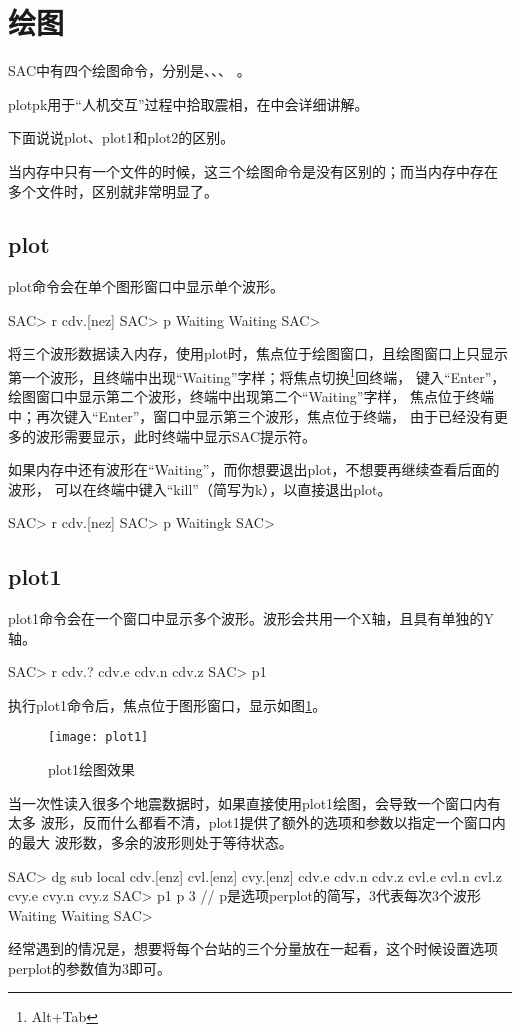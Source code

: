 \section{绘图}
SAC中有四个绘图命令，分别是、、、
。

plotpk用于``人机交互''过程中拾取震相，在中会详细讲解。

下面说说plot、plot1和plot2的区别。

当内存中只有一个文件的时候，这三个绘图命令是没有区别的；而当内存中存在
多个文件时，区别就非常明显了。

\subsection{plot}
plot命令会在单个图形窗口中显示单个波形。
\begin{SACCode}
SAC> r cdv.[nez]
SAC> p
Waiting
Waiting
SAC>
\end{SACCode}
将三个波形数据读入内存，使用plot时，焦点位于绘图窗口，且绘图窗口上只显示
第一个波形，且终端中出现``Waiting''字样；将焦点切换\footnote{Alt+Tab}回终端，
键入``Enter''，绘图窗口中显示第二个波形，终端中出现第二个``Waiting''字样，
焦点位于终端中；再次键入``Enter''，窗口中显示第三个波形，焦点位于终端，
由于已经没有更多的波形需要显示，此时终端中显示SAC提示符。

如果内存中还有波形在``Waiting''，而你想要退出plot，不想要再继续查看后面的波形，
可以在终端中键入``kill''（简写为k），以直接退出plot。
\begin{SACCode}
SAC> r cdv.[nez]
SAC> p
Waitingk
SAC>
\end{SACCode}

\subsection{plot1}
plot1命令会在一个窗口中显示多个波形。波形会共用一个X轴，且具有单独的Y轴。
\begin{SACCode}
SAC> r cdv.?
cdv.e cdv.n cdv.z
SAC> p1
\end{SACCode}
执行plot1命令后，焦点位于图形窗口，显示如图\ref{fig:plot1}。
\begin{figure}[H]
\centering
\texttt{[image: plot1]}
\caption{plot1绘图效果}
\label{fig:plot1}
\end{figure}

当一次性读入很多个地震数据时，如果直接使用plot1绘图，会导致一个窗口内有太多
波形，反而什么都看不清，plot1提供了额外的选项和参数以指定一个窗口内的最大
波形数，多余的波形则处于等待状态。
\begin{SACCode}
SAC> dg sub local cdv.[enz] cvl.[enz] cvy.[enz]
cdv.e cdv.n cdv.z cvl.e cvl.n cvl.z cvy.e cvy.n cvy.z
SAC> p1 p 3         // p是选项perplot的简写，3代表每次3个波形
Waiting
Waiting
SAC> 
\end{SACCode}
经常遇到的情况是，想要将每个台站的三个分量放在一起看，这个时候设置选项perplot的参数值为3即可。

